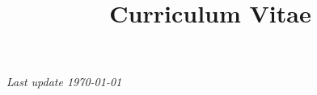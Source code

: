 \documentclass[12pt, letterpaper, unicode]{moderncv}
\title{Curriculum Vitae}
\begin{document}
    \makecvtitle

    
    
    
    
    
    
    
    
    
    
    
    
    

    
    \emptysection{}\closesection
    \vfill
    \begin{center}
    \textit{\footnotesize{Last update \today}}
    \end{center}
\end{document}
